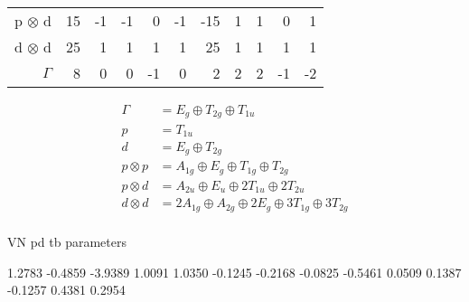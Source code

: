 \documentclass[preprint,showpacs,preprintnumbers,superscriptaddress,prb,floatfix,aps]{revtex4-1}
\begin{document}
\begin{table}
\begin{ruledtabular}
\begin{tabular}{rrrrrrrrrrr}
p $\otimes$ d & 15  &     -1 &    -1  &     0  &    -1  & -15  &          1  &          1  &          0  &          1  \\
d $\otimes$ d & 25  &      1 &     1  &     1  &     1  &  25  &          1  &          1  &          1  &          1  \\ \hline  
$\Gamma$      &  8  &      0 &     0  &    -1  &     0  &   2  &          2  &          2  &         -1  &         -2   \\
\end{tabular}
\end{ruledtabular}
\end{table}


\begin{align}
    \Gamma  &=      E_g \oplus T_{2g} \oplus T_{1u}                                   \\
          p &=   T_{1u}                                                               \\
          d &=      E_g \oplus T_{2g}                                                 \\
p \otimes p &=   A_{1g} \oplus E_g    \oplus   T_{1g} \oplus   T_{2g}                 \\
p \otimes d &=   A_{2u} \oplus E_u    \oplus 2 T_{1u} \oplus 2 T_{2u}                 \\
d \otimes d &= 2 A_{1g} \oplus A_{2g} \oplus 2 E_g    \oplus 3 T_{1g} \oplus 3 T_{2g} \\
\end{align}








VN pd tb parameters

    1.2783
   -0.4859
   -3.9389
    1.0091
    1.0350
   -0.1245
   -0.2168
   -0.0825
   -0.5461
    0.0509
    0.1387
   -0.1257
    0.4381
    0.2954
\end{document}
